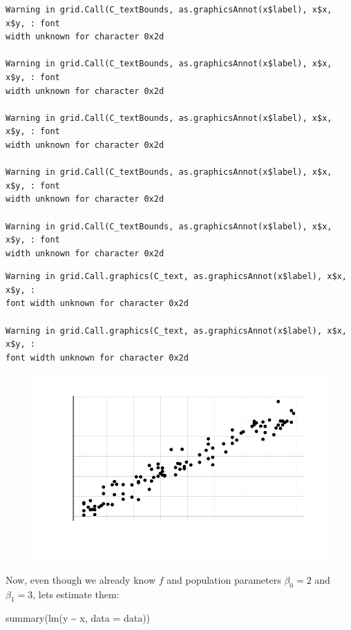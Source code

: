 \documentclass[
  letterpaper,
  DIV=11,
  numbers=noendperiod]{scrreprt}
\newenvironment{Shaded}{\begin{snugshade}}{\end{snugshade}}
\newcommand{\AttributeTok}[1]{\textcolor[rgb]{0.65,0.35,0.00}{#1}}
\newcommand{\FunctionTok}[1]{\textcolor[rgb]{0.02,0.16,0.49}{#1}}
\newcommand{\NormalTok}[1]{\textcolor[rgb]{0.33,0.33,0.33}{#1}}
\newcommand{\SpecialCharTok}[1]{\textcolor[rgb]{0.00,0.46,0.62}{#1}}
\begin{document}
\begin{verbatim}
Warning in grid.Call(C_textBounds, as.graphicsAnnot(x$label), x$x, x$y, : font
width unknown for character 0x2d

Warning in grid.Call(C_textBounds, as.graphicsAnnot(x$label), x$x, x$y, : font
width unknown for character 0x2d

Warning in grid.Call(C_textBounds, as.graphicsAnnot(x$label), x$x, x$y, : font
width unknown for character 0x2d

Warning in grid.Call(C_textBounds, as.graphicsAnnot(x$label), x$x, x$y, : font
width unknown for character 0x2d

Warning in grid.Call(C_textBounds, as.graphicsAnnot(x$label), x$x, x$y, : font
width unknown for character 0x2d
\end{verbatim}

\begin{verbatim}
Warning in grid.Call.graphics(C_text, as.graphicsAnnot(x$label), x$x, x$y, :
font width unknown for character 0x2d

Warning in grid.Call.graphics(C_text, as.graphicsAnnot(x$label), x$x, x$y, :
font width unknown for character 0x2d
\end{verbatim}

\begin{figure}[H]

{\centering \includegraphics{Chapter3_files/figure-pdf/unnamed-chunk-13-1.pdf}

}

\end{figure}

Now, even though we already know \(f\) and population parameters
\(\beta_0 = 2\) and \(\beta_1 = 3\), lets estimate them:

\begin{Shaded}
\begin{Highlighting}[]
\FunctionTok{summary}\NormalTok{(}\FunctionTok{lm}\NormalTok{(y }\SpecialCharTok{\textasciitilde{}}\NormalTok{ x, }\AttributeTok{data =}\NormalTok{ data))}
\end{Highlighting}
\end{Shaded}
\end{document}

